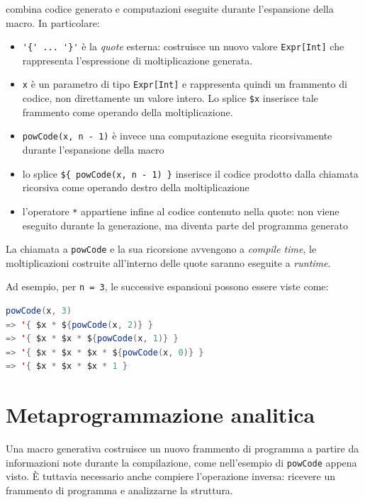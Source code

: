 \documentclass[a4paper,11pt]{report}
\theoremstyle{definition}
\begin{document}
combina codice generato e computazioni eseguite durante l'espansione della macro. In particolare:

\begin{itemize}
    \item \verb|'{' ... '}'| è la \emph{quote} esterna: costruisce un nuovo valore \verb|Expr[Int]| che rappresenta l'espressione di moltiplicazione generata.

    \item \verb|x| è un parametro di tipo \verb|Expr[Int]| e rappresenta quindi un frammento di codice, non direttamente un valore intero. Lo splice \verb|$x| inserisce tale frammento come operando della moltiplicazione.

    \item \verb|powCode(x, n - 1)| è invece una computazione eseguita ricorsivamente durante l'espansione della macro

    \item lo splice \verb|${ powCode(x, n - 1) }| inserisce il codice prodotto dalla chiamata ricorsiva come operando destro della moltiplicazione

    \item l'operatore \verb|*| appartiene infine al codice contenuto nella quote: non viene eseguito durante la generazione, ma diventa parte del programma generato
\end{itemize}

La chiamata a \texttt{powCode} e la sua ricorsione avvengono a \emph{compile time}, le moltiplicazioni costruite all'interno delle quote saranno eseguite a \emph{runtime}.

Ad esempio, per \verb|n = 3|, le successive espansioni possono essere viste come:

\begin{lstlisting}[language=Scala]
powCode(x, 3)
=> '{ $x * ${powCode(x, 2)} }
=> '{ $x * $x * ${powCode(x, 1)} }
=> '{ $x * $x * $x * ${powCode(x, 0)} }
=> '{ $x * $x * $x * 1 }
\end{lstlisting}

\section{Metaprogrammazione analitica}
\label{sec:generative-analytical}

Una macro generativa costruisce un nuovo frammento di programma a partire da informazioni note durante la compilazione, come nell'esempio di \texttt{powCode} appena visto. È tuttavia necessario anche compiere l'operazione inversa: ricevere un frammento di programma e analizzarne la struttura.
\end{document}
